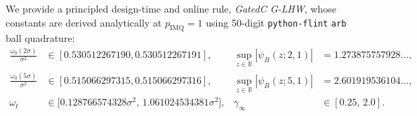 \documentclass[11pt,a4paper,reqno]{amsart}
\theoremstyle{definition}
\theoremstyle{remark}
\newcommand{\R}{\mathbb{R}}
\begin{document}
We provide a principled design-time and online rule, \emph{GatedC G-LHW}, whose constants are derived analytically at $p_{\mathrm{IMQ}} = 1$ using 50-digit \texttt{python-flint} \texttt{arb} ball quadrature:
\begin{equation}\label{eq:constants_decl}
\begin{aligned}
\frac{\omega_0(2\sigma)}{\sigma^2} &\in [0.530512267190, 0.530512267191], &
\sup_{z\in\R}|\psi_B(z; 2, 1)| &= 1.273875757928\dots,\\
\frac{\omega_0(5\sigma)}{\sigma^2} &\in [0.515066297315, 0.515066297316], &
\sup_{z\in\R}|\psi_B(z; 5, 1)| &= 2.601919536104\dots,\\
\omega_t &\in \bigl[0.128766574328\sigma^2,\, 1.061024534381\sigma^2\bigr], &
\gamma_\infty &\in [0.25,\, 2.0].
\end{aligned}
\end{equation}
\end{document}

